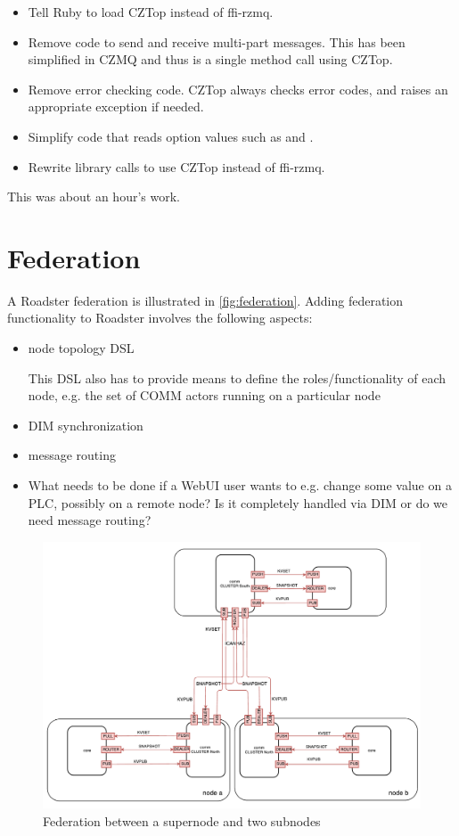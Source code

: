 \begin{itemize}
\item Tell Ruby to load CZTop instead of ffi-rzmq.
\item Remove code to send and receive multi-part messages. This has been simplified
in CZMQ and thus is a single method call using CZTop.
\item Remove error checking code. CZTop always checks error codes, and raises
an appropriate exception if needed.
\item Simplify code that reads option values such as  and .
\item Rewrite library calls to use CZTop instead of ffi-rzmq.
\end{itemize}

This was about an hour's work.

\section{Federation}\label{sec:approach:federation}
A Roadster federation is illustrated in \autoref{fig:federation}. Adding federation
functionality to Roadster involves the following aspects:
\begin{itemize}
	\item node topology DSL

		This DSL also has to provide means to define the
		roles/functionality of each node, e.g. the set of COMM actors
		running on a particular node

	\item DIM synchronization
	\item message routing
	\item What needs to be done if a WebUI user wants to e.g. change some
		value on a PLC, possibly on a remote node? Is it completely
		handled via DIM or do we need message routing?
\end{itemize}

\begin{figure}[]
	\includegraphics[width=\textwidth]{img/federation_protocol.pdf}
	\caption{Federation between a supernode and two subnodes}
	\label{fig:federation}
\end{figure}

